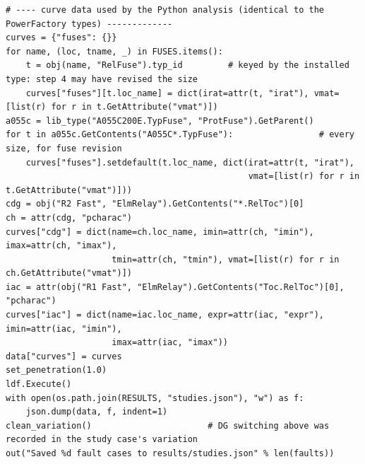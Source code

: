 \documentclass[12pt,a4paper]{article}
\begin{document}
\begin{lstlisting}
# ---- curve data used by the Python analysis (identical to the PowerFactory types) -------------
curves = {"fuses": {}}
for name, (loc, tname, _) in FUSES.items():
    t = obj(name, "RelFuse").typ_id         # keyed by the installed type: step 4 may have revised the size
    curves["fuses"][t.loc_name] = dict(irat=attr(t, "irat"), vmat=[list(r) for r in t.GetAttribute("vmat")])
a055c = lib_type("A055C200E.TypFuse", "ProtFuse").GetParent()
for t in a055c.GetContents("A055C*.TypFuse"):                 # every size, for fuse revision
    curves["fuses"].setdefault(t.loc_name, dict(irat=attr(t, "irat"),
                                                vmat=[list(r) for r in t.GetAttribute("vmat")]))
cdg = obj("R2 Fast", "ElmRelay").GetContents("*.RelToc")[0]
ch = attr(cdg, "pcharac")
curves["cdg"] = dict(name=ch.loc_name, imin=attr(ch, "imin"), imax=attr(ch, "imax"),
                     tmin=attr(ch, "tmin"), vmat=[list(r) for r in ch.GetAttribute("vmat")])
iac = attr(obj("R1 Fast", "ElmRelay").GetContents("Toc.RelToc")[0], "pcharac")
curves["iac"] = dict(name=iac.loc_name, expr=attr(iac, "expr"), imin=attr(iac, "imin"),
                     imax=attr(iac, "imax"))
data["curves"] = curves
set_penetration(1.0)
ldf.Execute()
with open(os.path.join(RESULTS, "studies.json"), "w") as f:
    json.dump(data, f, indent=1)
clean_variation()                       # DG switching above was recorded in the study case's variation
out("Saved %d fault cases to results/studies.json" % len(faults))
\end{lstlisting}
\end{document}
